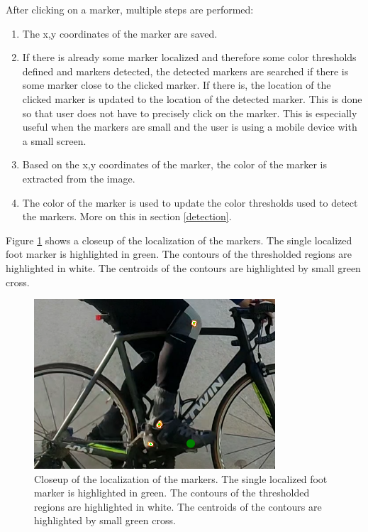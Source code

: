 After clicking on a marker, multiple steps are performed:
\begin{enumerate}
    \item The x,y coordinates of the marker are saved.
    \item If there is already some marker localized and therefore some color thresholds defined and markers detected, the detected markers are searched if there is some marker close to the clicked marker. If there is, the location of the clicked marker is updated to the location of the detected marker. This is done so that user does not have to precisely click on the marker. This is especially useful when the markers are small and the user is using a mobile device with a small screen.
    \item Based on the x,y coordinates of the marker, the color of the marker is extracted from the image.
    \item The color of the marker is used to update the color thresholds used to detect the markers. More on this in section \ref{detection}.
\end{enumerate}

Figure \ref{fig:marker_crop} shows a closeup of the localization of the markers. The single localized foot marker is highlighted in green. The contours of the thresholded regions are highlighted in white. The centroids of the contours are highlighted by small green cross.
\begin{figure}[htbp]
    \centering
    \includegraphics[width=\textwidth]{obrazky-figures/markers_crop.png}
    \caption{Closeup of the localization of the markers. The single localized foot marker is highlighted in green. The contours of the thresholded regions are highlighted in white. The centroids of the contours are highlighted by small green cross.}
    \label{fig:marker_crop}
\end{figure}

